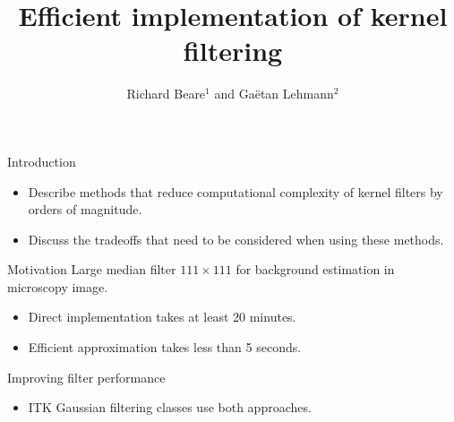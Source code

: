 \documentclass[pdf,prettybox]{prosper}
\title{Efficient implementation of kernel filtering}
\author{Richard Beare{$^1$} {\small{and}} Ga\"etan Lehmann{$^2$}}
\begin{document}
\maketitle

\begin{slide}{Introduction}
\begin{itemize}
\item Describe methods that reduce computational complexity of kernel filters by orders of magnitude.
\item Discuss the tradeoffs that need to be considered when using these methods.
\end{itemize}
\end{slide}

\begin{slide}{Motivation}
Large median filter $111 \times 111$ for background estimation in microscopy image.
\begin{itemize}
\item Direct implementation takes at least 20 minutes.
\item Efficient approximation takes less than 5 seconds.
\end{itemize}
\end{slide}


\begin{slide}{Improving filter performance}
\begin{itemize}
\item ITK Gaussian filtering classes use both approaches.
\end{itemize}
\end{slide}
\end{document}
